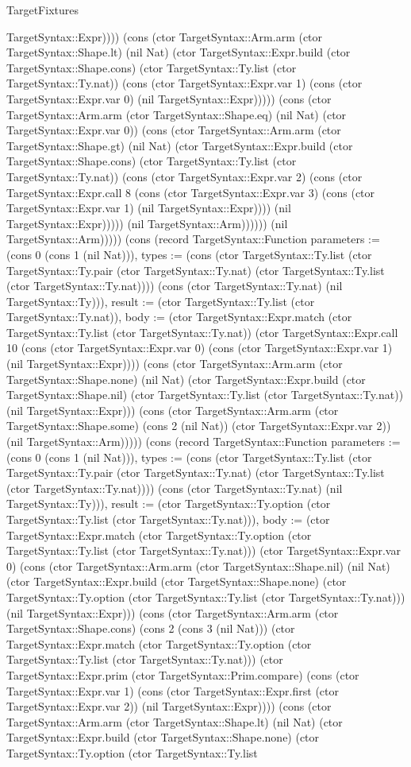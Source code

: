 \begin{lexlean}{TargetFixtures}
\begin{semanticmodule}
{TargetSyntax::Expr)))) (cons (ctor TargetSyntax::Arm.arm (ctor TargetSyntax::Shape.lt) (nil Nat) (ctor TargetSyntax::Expr.build (ctor TargetSyntax::Shape.cons) (ctor TargetSyntax::Ty.list (ctor TargetSyntax::Ty.nat)) (cons (ctor TargetSyntax::Expr.var 1) (cons (ctor TargetSyntax::Expr.var 0) (nil TargetSyntax::Expr))))) (cons (ctor TargetSyntax::Arm.arm (ctor TargetSyntax::Shape.eq) (nil Nat) (ctor TargetSyntax::Expr.var 0)) (cons (ctor TargetSyntax::Arm.arm (ctor TargetSyntax::Shape.gt) (nil Nat) (ctor TargetSyntax::Expr.build (ctor TargetSyntax::Shape.cons) (ctor TargetSyntax::Ty.list (ctor TargetSyntax::Ty.nat)) (cons (ctor TargetSyntax::Expr.var 2) (cons (ctor TargetSyntax::Expr.call 8 (cons (ctor TargetSyntax::Expr.var 3) (cons (ctor TargetSyntax::Expr.var 1) (nil TargetSyntax::Expr)))) (nil TargetSyntax::Expr))))) (nil TargetSyntax::Arm)))))) (nil TargetSyntax::Arm))))}) (cons (record TargetSyntax::Function {parameters := (cons 0 (cons 1 (nil Nat))), types := (cons (ctor TargetSyntax::Ty.list (ctor TargetSyntax::Ty.pair (ctor TargetSyntax::Ty.nat) (ctor TargetSyntax::Ty.list (ctor TargetSyntax::Ty.nat)))) (cons (ctor TargetSyntax::Ty.nat) (nil TargetSyntax::Ty))), result := (ctor TargetSyntax::Ty.list (ctor TargetSyntax::Ty.nat)), body := (ctor TargetSyntax::Expr.match (ctor TargetSyntax::Ty.list (ctor TargetSyntax::Ty.nat)) (ctor TargetSyntax::Expr.call 10 (cons (ctor TargetSyntax::Expr.var 0) (cons (ctor TargetSyntax::Expr.var 1) (nil TargetSyntax::Expr)))) (cons (ctor TargetSyntax::Arm.arm (ctor TargetSyntax::Shape.none) (nil Nat) (ctor TargetSyntax::Expr.build (ctor TargetSyntax::Shape.nil) (ctor TargetSyntax::Ty.list (ctor TargetSyntax::Ty.nat)) (nil TargetSyntax::Expr))) (cons (ctor TargetSyntax::Arm.arm (ctor TargetSyntax::Shape.some) (cons 2 (nil Nat)) (ctor TargetSyntax::Expr.var 2)) (nil TargetSyntax::Arm))))}) (cons (record TargetSyntax::Function {parameters := (cons 0 (cons 1 (nil Nat))), types := (cons (ctor TargetSyntax::Ty.list (ctor TargetSyntax::Ty.pair (ctor TargetSyntax::Ty.nat) (ctor TargetSyntax::Ty.list (ctor TargetSyntax::Ty.nat)))) (cons (ctor TargetSyntax::Ty.nat) (nil TargetSyntax::Ty))), result := (ctor TargetSyntax::Ty.option (ctor TargetSyntax::Ty.list (ctor TargetSyntax::Ty.nat))), body := (ctor TargetSyntax::Expr.match (ctor TargetSyntax::Ty.option (ctor TargetSyntax::Ty.list (ctor TargetSyntax::Ty.nat))) (ctor TargetSyntax::Expr.var 0) (cons (ctor TargetSyntax::Arm.arm (ctor TargetSyntax::Shape.nil) (nil Nat) (ctor TargetSyntax::Expr.build (ctor TargetSyntax::Shape.none) (ctor TargetSyntax::Ty.option (ctor TargetSyntax::Ty.list (ctor TargetSyntax::Ty.nat))) (nil TargetSyntax::Expr))) (cons (ctor TargetSyntax::Arm.arm (ctor TargetSyntax::Shape.cons) (cons 2 (cons 3 (nil Nat))) (ctor TargetSyntax::Expr.match (ctor TargetSyntax::Ty.option (ctor TargetSyntax::Ty.list (ctor TargetSyntax::Ty.nat))) (ctor TargetSyntax::Expr.prim (ctor TargetSyntax::Prim.compare) (cons (ctor TargetSyntax::Expr.var 1) (cons (ctor TargetSyntax::Expr.first (ctor TargetSyntax::Expr.var 2)) (nil TargetSyntax::Expr)))) (cons (ctor TargetSyntax::Arm.arm (ctor TargetSyntax::Shape.lt) (nil Nat) (ctor TargetSyntax::Expr.build (ctor TargetSyntax::Shape.none) (ctor TargetSyntax::Ty.option (ctor TargetSyntax::Ty.list }
\end{semanticmodule}
\end{lexlean}
